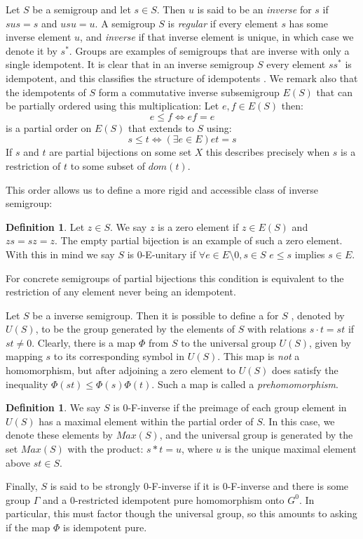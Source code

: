 \documentclass[11pt,a4paper]{amsart}
\theoremstyle{plain}
\theoremstyle{definition}%
\newtheorem{definition}[theorem]{Definition}%
\theoremstyle{remark}%
\begin{document}
Let $S$ be a semigroup and let $s \in S$. Then $u$ is said to be an \textit{inverse} for $s$ if $sus=s$ and $usu=u$. A semigroup $S$ is \textit{regular} if every element $s$ has some inverse element $u$, and \textit{inverse} if that inverse element is unique, in which case we denote it by $s^{*}$. Groups are examples of semigroups that are inverse with only a single idempotent. It is clear that in an inverse semigroup $S$ every element $ss^{*}$ is idempotent, and this classifies the structure of idempotents \cite{MR1455373}. We remark also that the idempotents of $S$ form a commutative inverse subsemigroup $E(S)$ that can be partially ordered using this multiplication: Let $e,f \in E(S)$ then:
\begin{equation*}
e \leq f \Leftrightarrow ef=e
\end{equation*}
is a partial order on $E(S)$ that extends to $S$ using:
\begin{equation*}
s \leq t \Leftrightarrow (\exists e \in E) et=s
\end{equation*}
If $s$ and $t$ are partial bijections on some set $X$ this describes precisely when $s$ is a restriction of $t$ to some subset of $dom(t)$.

This order allows us to define a more rigid and accessible class of inverse semigroup:

\begin{definition}
Let $z \in S$. We say $z$ is a zero element if $z \in E(S)$ and $zs=sz=z$. The empty partial bijection is an example of such a zero element. With this in mind we say $S$ is 0-E-unitary if $\forall e \in E\setminus 0, s \in S$ $e \leq s$ implies $s \in E$.
\end{definition}

For concrete semigroups of partial bijections this condition is equivalent to the restriction of any element never being an idempotent.

Let $S$ be a inverse semigroup. Then it is possible to define a  for $S$ \cite{MR2058453}, denoted by $U(S)$, to be the group generated by the elements of $S$ with relations $s\cdot t = st$ if $st \not = 0$. Clearly, there is a map $\Phi$ from $S$ to the universal group $U(S)$, given by mapping $s$ to its corresponding symbol in $U(S)$. This map is \textit{not} a homomorphism, but after adjoining a zero element to $U(S)$ does satisfy the inequality $\Phi(st) \leq \Phi(s)\Phi(t)$. Such a map is called a \textit{prehomomorphism}. 

\begin{definition}
We say $S$ is 0-F-inverse if the preimage of each group element in $U(S)$ has a maximal element within the partial order of $S$. In this case, we denote these elements by $Max(S)$, and the universal group is generated by the set $Max(S)$ with the product: $s\ast t = u$, where $u$ is the unique maximal element above $st \in S$. 

Finally, $S$ is said to be strongly $0$-F-inverse if it is $0$-F-inverse and there is some group $\Gamma$ and a $0$-restricted idempotent pure homomorphism onto $G^{0}$. In particular, this must factor though the universal group, so this amounts to asking if the map $\Phi$ is idempotent pure.
\end{definition}
\end{document}
